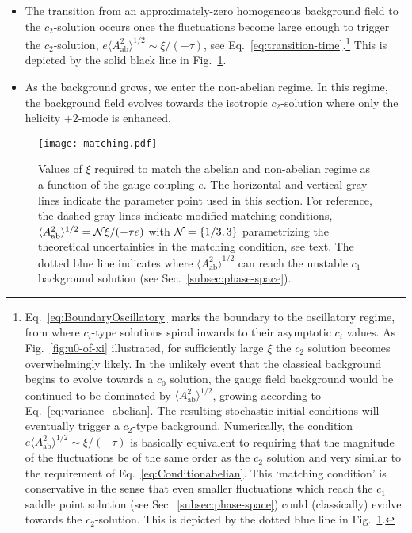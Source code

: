 \begin{itemize}
  \item The transition from an approximately-zero homogeneous background field to the $c_2$-solution occurs once the fluctuations become large enough to trigger the $c_2$-solution, $ e \langle A_\text{ab}^2 \rangle^{1/2} \sim \xi / (- \tau)$, see Eq.~\eqref{eq:transition-time}.\footnote{Eq.~\eqref{eq:BoundaryOscillatory} marks the boundary to the oscillatory regime, from where $c_i$-type solutions spiral inwards to their asymptotic $c_i$ values. As Fig.~\ref{fig:u0-of-xi} illustrated, for sufficiently large $\xi$ the $c_2$ solution becomes overwhelmingly likely. In the unlikely event that the classical background begins to evolve towards a $c_0$ solution, the gauge field background would be continued to be dominated by $\langle A_\text{ab}^2 \rangle^{1/2}$, growing according to Eq.~\eqref{eq:variance_abelian}. The resulting stochastic initial conditions will eventually trigger a $c_2$-type background. Numerically, the condition $ e \langle A_\text{ab}^2 \rangle^{1/2} \sim \xi / (- \tau)$ is basically equivalent to requiring that the magnitude of the fluctuations be of the same order as the $c_2$ solution and very similar to the requirement of Eq.~\eqref{eq:Conditionabelian}. This `matching condition' is conservative in the sense that even smaller fluctuations which reach the  $c_1$ saddle point solution (see Sec.~\ref{subsec:phase-space}) could (classically) evolve towards the $c_2$-solution. This is depicted by the dotted blue line in Fig.~\ref{fig:matching}. } This is depicted by the solid black line in Fig.~\ref{fig:matching}.

  \item As the background grows, we enter the non-abelian regime.  In this regime, the background field evolves towards the isotropic $c_2$-solution where only the helicity $+2$-mode is enhanced.
  \end{itemize}

\begin{figure}
 \centering
 \texttt{[image: matching.pdf]}
 \caption{Values of $\xi$ required to match the abelian and non-abelian regime as a function of the gauge coupling $e$. The horizontal and vertical gray lines indicate the parameter point used in this section. {For reference, the dashed gray lines indicate modified matching conditions, $\langle A_\text{ab}^2 \rangle^{1/2} = {\cal N} \xi /(- \tau e)$ with ${\cal N} = \{1/3, 3 \}$ parametrizing the theoretical uncertainties in the matching condition, see text. The dotted blue line indicates where $\langle A_\text{ab}^2 \rangle^{1/2}$ can reach the unstable $c_1$ background solution  (see Sec.~\ref{subsec:phase-space}). }}
 \label{fig:matching}
\end{figure}

